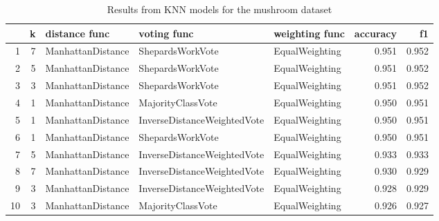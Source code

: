 \begin{table}
\centering
\caption{Results from KNN models for the mushroom dataset}
\begin{tabular}{rrlllrr}
\toprule
 & k & distance func & voting func & weighting func & accuracy & f1 \\
\midrule
1 & 7 & ManhattanDistance & ShepardsWorkVote & EqualWeighting & 0.951 & 0.952 \\
2 & 5 & ManhattanDistance & ShepardsWorkVote & EqualWeighting & 0.951 & 0.952 \\
3 & 3 & ManhattanDistance & ShepardsWorkVote & EqualWeighting & 0.951 & 0.952 \\
4 & 1 & ManhattanDistance & MajorityClassVote & EqualWeighting & 0.950 & 0.951 \\
5 & 1 & ManhattanDistance & InverseDistanceWeightedVote & EqualWeighting & 0.950 & 0.951 \\
6 & 1 & ManhattanDistance & ShepardsWorkVote & EqualWeighting & 0.950 & 0.951 \\
7 & 5 & ManhattanDistance & InverseDistanceWeightedVote & EqualWeighting & 0.933 & 0.933 \\
8 & 7 & ManhattanDistance & InverseDistanceWeightedVote & EqualWeighting & 0.930 & 0.929 \\
9 & 3 & ManhattanDistance & InverseDistanceWeightedVote & EqualWeighting & 0.928 & 0.929 \\
10 & 3 & ManhattanDistance & MajorityClassVote & EqualWeighting & 0.926 & 0.927 \\
\bottomrule
\end{tabular}
\end{table}

